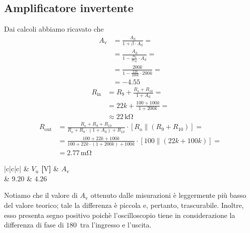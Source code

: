 \documentclass[a4paper]{article}
\begin{document}
		\subsection{Amplificatore invertente}
			Dai calcoli abbiamo ricavato che
			\begin{equation*}
				\begin{split}
					A_{\mathrm{v}} &= \frac{A_{\mathrm{d}}}{1 + \beta \cdot A_{\mathrm{d}}} = \\
								   &= \frac{A_{\mathrm{d}}}{1 -\frac{R_{9}}{R_{10}} \cdot A_{\mathrm{d}}} = \\
								   &= \frac{200k}{1 -\frac{22k}{100k} \cdot 200k} = \\
								   &= -4.55
				\end{split}
			\end{equation*}
			\begin{equation*}
				\begin{split}
					R_{\mathrm{in}} &= R_{9} + \frac{R_{\mathrm{o}} + R_{10}}{1 + A_{\mathrm{d}}} = \\
									&= 22k + \frac{100 + 100k}{1 + 200k} = \\
									&\approx 22 \, \mathrm{k\Omega}
				\end{split}
			\end{equation*}
			\begin{equation*}
				\begin{split}
					R_{\mathrm{out}} &= \frac{R_{\mathrm{o}} + R_{9} + R_{10}}{R_{\mathrm{o}} + R_{9} \cdot (1 + A_{\mathrm{d}}) + R_{10}} \cdot [R_{\mathrm{o}} \parallel (R_{9} + R_{10})] = \\
									 &= \frac{100 + 22k + 100k}{100 + 22k \cdot (1 + 200k) + 100k} \cdot [100 \parallel (22k + 100k)] = \\
									 &= 2.77 \, \mathrm{m\Omega}
				\end{split}
			\end{equation*}
			\begin{center}
				\begin{tabular}{ |c|c|c| }
					\hline
					 & \textbf{$ V_{\mathrm{u}} $ [$ \mathrm{V} $]} & \textbf{$ A_{\mathrm{v}} $} \\
					\hline
					 									& $ 9.20 $ 									   & $ 4.26 $ \\
					\hline
				\end{tabular}
			\end{center}
			Notiamo che il valore di $ A_{\mathrm{v}} $ ottenuto dalle misurazioni è leggermente più basso del valore teorico; tale la differenza è piccola e, pertanto, trascurabile. Inoltre, esso presenta segno positivo poichè l’oscilloscopio tiene in considerazione la differenza di fase di $ 180 $\textdegree \ tra l'ingresso e l'uscita.
\end{document}
